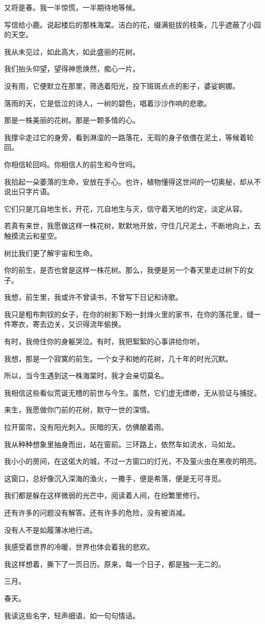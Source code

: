 \documentclass[12pt,a4paper]{article}
\def\blankrev{\vspace{1ex}}									%
\begin{document}
		\blankrev
		又将是春。我一半惊慌，一半期待地等候。\par
		写信给小鹿。说起楼后的那株海棠。洁白的花，缀满挺拔的枝条，几乎遮蔽了小园的天空。\par
		我从未见过，如此高大，如此盛丽的花树。\par
		我们抬头仰望，望得神思焕然，痴心一片。\par
		没有雨，它便默立在那里，筛选着阳光，投下斑斑点点的影子，婆娑婀娜。\par
		落雨的天，它是低泣的诗人，一树的碧色，唱着沙沙作响的悲歌。\par
		那是一株美丽的花树。那是一颗多情的心。\par
		我撑伞走过它的身旁，看到淋湿的一路落花，无瑕的身子依偎在泥土，等候着轮回。\par
		你相信轮回吗。你相信人的前生和今世吗。\par
		我拾起一朵萎落的生命，安放在手心。也许，植物懂得这世间的一切奥秘，却从不说出只字片语。\par
		它们只是兀自地生长，开花，兀自地生与灭，信守着天地的约定，淡定从容。\par
		若真有来世，我愿做这样一株花树，默默地开放，守住几尺泥土，不断地向上，去触摸流云和星空。\par
		树比我们更了解宇宙和生命。\par
		你的前生，是否也曾是这样一株花树。那么，我便是另一个春天里走过树下的女子。\par
		我想，前生里，我或许不曾读书，不曾写下日记和诗歌。\par
		我只是粗布荆钗的女子，在你的树影下盼一封烽火里的家书，在你的落花里，缝一件寒衣，寄去边关，又识得流年偷换。\par
		有时，我倚住你的身躯哭泣。有时，我把絮絮的心事讲给你听。\par
		我想，那是一个寂寞的前生。一个女子和她的花树，几十年的时光沉默。\par
		所以，当今生遇到这一株海棠时，我才会亲切莫名。\par
		我相信这些看似荒诞无稽的前世与今生。虽然，它们虚无缥缈，无从验证与捕捉。\par
		来生，我愿做你门前的花树，默守一世的深情。

		\blankrev
		拉开窗帘，没有阳光刺入。灰暗的天，仿佛酿着雨。\par
		我从种种想象里抽身而出，站在窗前。三环路上，依然车如流水，马如龙。\par
		我小小的房间，在这偌大的城，不过一方窗口的灯光，不及萤火虫在黑夜的明亮。\par
		这窗口，总好像沉入深海的渔火，一撒手，便是希落，便是无可寻觅。\par
		我们都是躲在这样微弱的光芒中，阅读着人间，在纷繁里修行。\par
		还有许多的问题没有解答。还有许多的危险，没有被消减。\par
		没有人不是如履薄冰地行进。\par
		我感受着世界的冷暖，世界也体会着我的悲欢。\par
		我这样想着，撕下了一页日历。原来，每一个日子，都是独一无二的。\par
		三月。\par
		春天。\par
		我读这些名字，轻声细语，如一句句情话。
\end{document}

